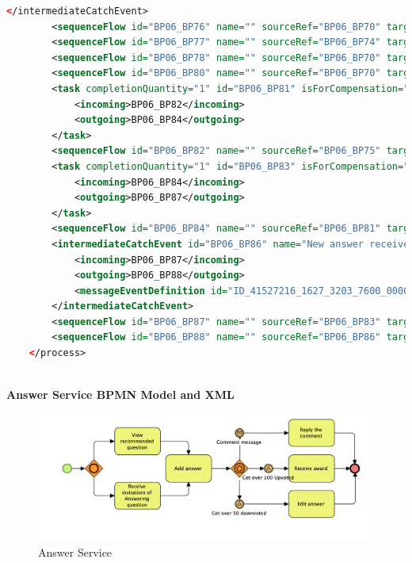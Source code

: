 \documentclass[runningheads]{llncs}
\begin{document}
\begin{lstlisting}[language={XML}]
		</intermediateCatchEvent>
		<sequenceFlow id="BP06_BP76" name="" sourceRef="BP06_BP70" targetRef="BP06_BP74"/>
		<sequenceFlow id="BP06_BP77" name="" sourceRef="BP06_BP74" targetRef="BP06_BP60"/>
		<sequenceFlow id="BP06_BP78" name="" sourceRef="BP06_BP70" targetRef="BP06_BP72"/>
		<sequenceFlow id="BP06_BP80" name="" sourceRef="BP06_BP70" targetRef="BP06_BP75"/>
		<task completionQuantity="1" id="BP06_BP81" isForCompensation="false" name="Edit Question">
			<incoming>BP06_BP82</incoming>
			<outgoing>BP06_BP84</outgoing>
		</task>
		<sequenceFlow id="BP06_BP82" name="" sourceRef="BP06_BP75" targetRef="BP06_BP81"/>
		<task completionQuantity="1" id="BP06_BP83" isForCompensation="false" name="Follow Question">
			<incoming>BP06_BP84</incoming>
			<outgoing>BP06_BP87</outgoing>
		</task>
		<sequenceFlow id="BP06_BP84" name="" sourceRef="BP06_BP81" targetRef="BP06_BP83"/>
		<intermediateCatchEvent id="BP06_BP86" name="New answer received">
			<incoming>BP06_BP87</incoming>
			<outgoing>BP06_BP88</outgoing>
			<messageEventDefinition id="ID_41527216_1627_3203_7600_000000200064"/>
		</intermediateCatchEvent>
		<sequenceFlow id="BP06_BP87" name="" sourceRef="BP06_BP83" targetRef="BP06_BP86"/>
		<sequenceFlow id="BP06_BP88" name="" sourceRef="BP06_BP86" targetRef="BP06_BP37"/>
	</process>
    
	\end{lstlisting}
	\clearpage
	\textbf{Answer Service BPMN Model and XML}\\
	\begin{figure}
		\centering %
		\includegraphics[width=1.0\textwidth]{answerservice} %
		\caption{Answer Service} %
		\label{answerservice} %
	\end{figure}
\end{document}
